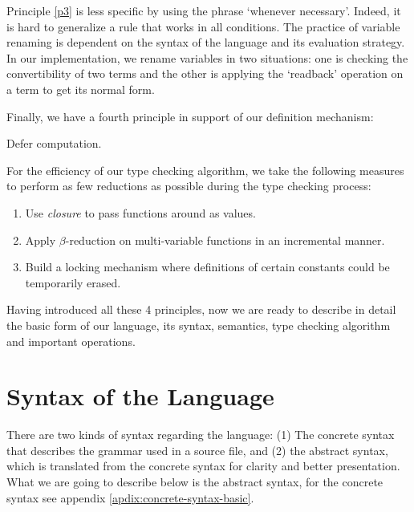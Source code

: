Principle \ref{p3} is less specific by using the phrase `whenever necessary'. Indeed, it is hard to generalize a rule that works in all conditions. The practice of variable renaming is dependent on the syntax of the language and its evaluation strategy. In our implementation, we rename variables in two situations: one is checking the convertibility of two terms and the other is applying the `readback' operation on a term to get its normal form.

Finally, we have a fourth principle in support of our definition mechanism:
\begin{principle} \label{p4}
  Defer computation.
\end{principle}
For the efficiency of our type checking algorithm, we take the following measures to perform as few reductions as possible during the type checking process:
\begin{enumerate}
\item Use \emph{closure} to pass functions around as values.
\item Apply $\beta$-reduction on multi-variable functions in an incremental manner.
\item Build a locking mechanism where definitions of certain constants could be temporarily erased.
\end{enumerate}

Having introduced all these 4 principles, now we are ready to describe in detail the basic form of our language, its syntax, semantics, type checking algorithm and important operations.

\section{Syntax of the Language}\label{theory:sec:syntax}
There are two kinds of syntax regarding the language: (1) The concrete syntax that describes the grammar used in a source file, and (2) the abstract syntax, which is translated from the concrete syntax for clarity and better presentation. What we are going to describe below is the abstract syntax, for the concrete syntax see appendix \ref{apdix:concrete-syntax-basic}. 

